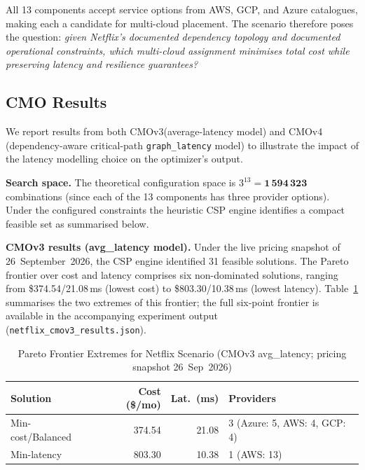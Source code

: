 \documentclass[journal]{IEEEtran}
\newcommand{\cmothree}{CMOv3\xspace}
\newcommand{\cmofour}{CMOv4\xspace}
\begin{document}
All 13 components accept service options from AWS, GCP, and Azure catalogues,
making each a candidate for multi-cloud placement. The scenario therefore
poses the question: \textit{given Netflix's documented dependency topology and
documented operational constraints, which multi-cloud assignment minimises
total cost while preserving latency and resilience guarantees?}

\subsection{CMO Results}
\label{sec:netflix_results}

We report results from both \cmothree (average-latency model) and \cmofour
(dependency-aware critical-path \texttt{graph\_latency} model) to illustrate the
impact of the latency modelling choice on the optimizer's output.

\textbf{Search space.}
The theoretical configuration space is $3^{13} = \mathbf{1\,594\,323}$
combinations (since each of the 13 components has three provider options). Under
the configured constraints the heuristic CSP engine identifies a compact feasible
set as summarised below.

\textbf{CMOv3 results (avg\_latency model).}
Under the live pricing snapshot of 26~September~2026, the CSP engine
identified 31 feasible solutions. The Pareto frontier over cost and latency
comprises six non-dominated solutions, ranging from \$374.54/21.08\,ms (lowest
cost) to \$803.30/10.38\,ms (lowest latency). Table~\ref{tab:netflix_pareto}
summarises the two extremes of this frontier; the full six-point frontier is
available in the accompanying experiment output
(\texttt{netflix\_cmov3\_results.json}).

\begin{table}[t]
\centering
\caption{Pareto Frontier Extremes for Netflix Scenario (CMOv3 avg\_latency;
pricing snapshot 26~Sep~2026)}
\label{tab:netflix_pareto}
\footnotesize
\setlength{\tabcolsep}{3pt}
\begin{tabular}{@{}lrrl@{}}
\toprule
Solution         & Cost (\$/mo) & Lat.\ (ms) & Providers \\
\midrule
Min-cost/Balanced & 374.54 & 21.08 & 3 (Azure: 5, AWS: 4, GCP: 4) \\
Min-latency       & 803.30 & 10.38 & 1 (AWS: 13)                 \\
\bottomrule
\end{tabular}
\end{table}
\end{document}
